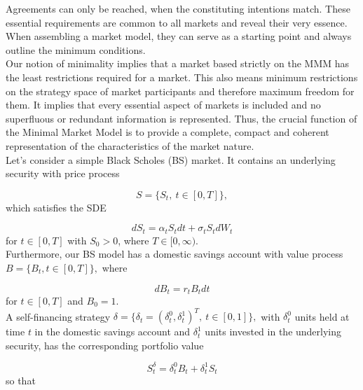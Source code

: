\documentclass[a4 paper, 12pt]{report}
\theoremstyle{plain}
\begin{document}
Agreements can only be reached, when the constituting intentions match. These essential requirements are common to all markets and reveal their very essence. When assembling a market model, they can serve as a starting point and always outline the minimum conditions.\\

Our notion of minimality implies that a market based strictly on the MMM has the least restrictions required for a market. This also means minimum restrictions on the strategy space of market participants and therefore maximum freedom for them. It implies that every essential aspect of markets is included and no superfluous or redundant information is represented. Thus, the crucial function of the Minimal Market Model is to provide a complete, compact and coherent representation of the characteristics of the market nature.\\
Let's consider a simple Black Scholes (BS) market. It contains an underlying security with price process

$$
S = \{S_t,~t\in[0,T]\},
$$
which satisfies the SDE

\begin{equation}\label{1}
dS_t = \alpha_t S_tdt+\sigma_tS_tdW_t
\end{equation}
for $t\in[0,T]$ with $S_0>0$, where $T\in[0,\infty)$.\\
Furthermore, our BS model has a domestic savings account with value process $B = \{B_t,t\in[0,T]\},$ where 

\begin{equation}\label{2}
dB_t = r_tB_tdt
\end{equation}
for $t\in[0,T]$ and $B_0  = 1$.\\
A self-financing strategy $\delta = \{\delta_t = (\delta_t^0,\delta_t^1)^T,~t\in[0,1]\},$ with $\delta_t^0$ units held at time $t$ in the domestic savings account and $\delta_t^1$ units invested in the underlying security, has the corresponding portfolio value

\begin{equation}\label{9.1.3}
S_t^\delta = \delta_t^0B_t+\delta_t^1S_t
\end{equation}
so that 
\end{document}
